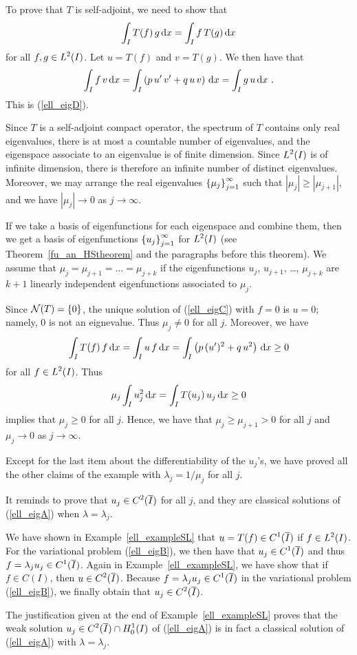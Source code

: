 \begin{egg}
To prove that $T$ is self-adjoint, we need to show that
\begin{equation} \label{ell_eigD}
\int_I T(f) \, g \,\mathrm{d}{x} = \int_I f\, T(g)\,\mathrm{d}{x}
\end{equation}
for all $\displaystyle f,g \in L^2(I)$.  Let $u=T(f)$ and $v=T(g)$.
We then have that
\[
\int_I f \, v \,\mathrm{d}{x}
= \int_I \left( p\, u'\, v' + q\, u\, v \right) \,\mathrm{d}{x}
= \int_I g \, u \,\mathrm{d}{x} \ .
\]
This is (\ref{ell_eigD}).

Since $T$ is a self-adjoint compact operator, the spectrum of $T$
contains only real eigenvalues, there is at most a countable number of
eigenvalues, and the eigenspace associate to an eigenvalue is of finite
dimension.  Since $\displaystyle L^2(I)$ is of infinite dimension, there is
therefore an infinite number of distinct eigenvalues.  Moreover, we
may arrange the real eigenvalues
$\displaystyle \left\{ \mu_j \right\}_{j=1}^\infty$
such that $|\mu_j| \geq |\mu_{j+1}|$, and we have $|\mu_j|\to 0$ as
$j \to \infty$.

If we take a basis of eigenfunctions for each eigenspace and combine
them, then we get a basis of eigenfunctions
$\displaystyle \left\{u_j\right\}_{j=1}^\infty$ for $\displaystyle L^2(I)$
(see Theorem~\ref{fu_an_HStheorem} and the paragraphs before this theorem).
We assume that $\mu_{j} = \mu_{j+1} = \ldots = \mu_{j+k}$ if
the eigenfunctions $u_j$, $u_{j+1}$, \ldots, $\mu_{j+k}$ are $k+1$ linearly
independent eigenfunctions associated to $\mu_j$.

Since $\mathcal{N}(T) = \left\{ 0 \right\}$, the unique solution of 
(\ref{ell_eigC}) with $f=0$ is $u=0$; namely, $0$ is not an eignevalue.  Thus
$\mu_j \neq 0$ for all $j$.  Moreover, we have
\[
\int_I T(f)\, f \,\mathrm{d}{x} = \int_I u \,f\,\mathrm{d}{x} =
\int_I \left( p \,(u')^2 + q\, u^2 \right) \,\mathrm{d}{x} \geq 0
\]
for all $\displaystyle f \in L^2(I)$.  Thus
\[
\mu_j \int_I u_j^2 \,\mathrm{d}{x}
= \int_I T(u_j)\, u_j \,\mathrm{d}{x} \geq 0
\]
implies that $\mu_j\geq 0$ for all $j$.  Hence, we have that
$\mu_j \geq \mu_{j+1} > 0$ for all $j$ and $\mu_j \to 0$ as
$j \to \infty$.

Except for the last item about the differentiability of the $u_j$'s,
we have proved all the other claims of the example with
$\lambda_j = 1/\mu_j$ for all $j$.

It reminds to prove that $\displaystyle u_j \in C^2(\overline{I})$ for
all $j$, and they are classical solutions of (\ref{ell_eigA}) when
$\lambda = \lambda_j$.

We have shown in Example~\ref{ell_exampleSL} that
$\displaystyle u = T(f) \in C^1(\overline{I})$ if
$\displaystyle f \in L^2(I)$.  For the
variational problem (\ref{ell_eigB}), we then have that
$\displaystyle u_j \in C^1(\overline{I})$ and
thus $\displaystyle f = \lambda_j u_j \in C^1(\overline{I})$.  Again in
Example~\ref{ell_exampleSL}, we have show that if $f \in C(I)$, then
$\displaystyle u \in C^2(\overline{I})$.  Because
$\displaystyle f = \lambda_j u_j \in C^1(\overline{I})$ in the variational
problem (\ref{ell_eigB}), we finally obtain that
$\displaystyle u_j \in C^2(\overline{I})$.

The justification given at the end of Example~\ref{ell_exampleSL}
proves that the weak solution
$\displaystyle u_j \in C^2(\overline{I}) \cap H^1_0(I)$ of (\ref{ell_eigA}) is
in fact a classical solution of (\ref{ell_eigA}) with
$\lambda = \lambda_j$.
\end{egg}

